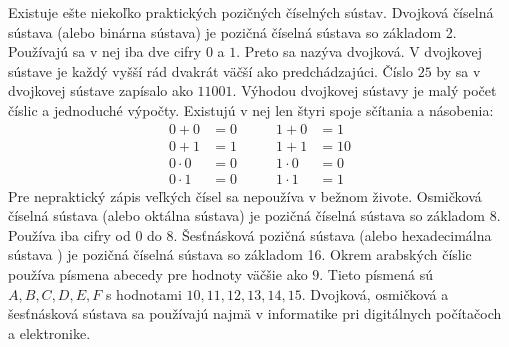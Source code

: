 \documentclass{article}
\begin{document}
Existuje ešte niekoľko praktických pozičných číselných sústav. Dvojková číselná sústava (alebo binárna sústava) je pozičná číselná sústava so základom 2. Používajú sa v nej iba dve cifry \(0\) a \(1\). Preto sa nazýva dvojková. V dvojkovej sústave je každý vyšší rád dvakrát väčší ako predchádzajúci. Číslo \(25\) by sa v dvojkovej sústave zapísalo ako \(11001\). Výhodou dvojkovej sústavy je malý počet číslic a jednoduché výpočty. Existujú v nej len štyri spoje sčítania a násobenia:
\[
\begin{aligned}
0+0 &= 0 &\qquad 1+0 &= 1 \\
0+1 &= 1 &\qquad 1+1 &= 10 \\[4pt]
0\cdot0 &= 0 &\qquad 1\cdot0 &= 0 \\
0\cdot1 &= 0 &\qquad 1\cdot1 &= 1
\end{aligned}
\]
Pre nepraktický zápis veľkých čísel sa nepoužíva v bežnom živote. Osmičková číselná sústava (alebo oktálna sústava) je pozičná číselná sústava so základom 8. Používa iba cifry od \(0\) do \(8\). Šesťnásková pozičná sústava (alebo hexadecimálna sústava ) je pozičná číselná sústava so základom 16. Okrem arabských číslic používa písmena abecedy pre hodnoty väčšie ako \(9\). Tieto písmená sú \(A, B, C, D, E, F\) s hodnotami \(10, 11, 12, 13, 14, 15\). Dvojková, osmičková a šesťnásková sústava sa používajú najmä v informatike pri digitálnych počítačoch a elektronike.

\printbibliography
\end{document}
